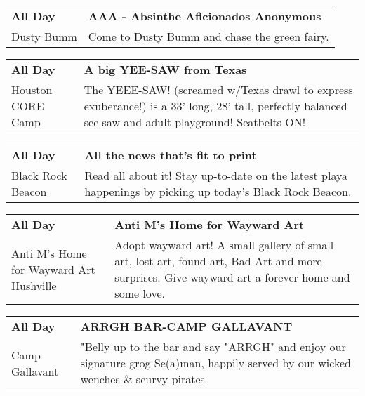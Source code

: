 \begin{tabular}{ p{1in} p{2.2in} }
    \textbf{All Day} & \textbf{AAA - Absinthe Aficionados Anonymous} \\
    Dusty Bumm \newline  & Come to Dusty Bumm and chase the green fairy. \\
    \hline 
\end{tabular}
    
\begin{tabular}{ p{1in} p{2.2in} }
    \textbf{All Day} & \textbf{A big YEE-SAW from Texas} \\
    Houston CORE Camp \newline  & The YEEE-SAW! (screamed w/Texas drawl to express exuberance!) is a 33' long, 28' tall, perfectly balanced see-saw and adult playground! Seatbelts ON! \\
    \hline 
\end{tabular}
    
\begin{tabular}{ p{1in} p{2.2in} }
    \textbf{All Day} & \textbf{All the news that's fit to print} \\
    Black Rock Beacon \newline  & Read all about it! Stay up-to-date on the latest playa happenings by picking up today's Black Rock Beacon. \\
    \hline 
\end{tabular}
    
\begin{tabular}{ p{1in} p{2.2in} }
    \textbf{All Day} & \textbf{Anti M's Home for Wayward Art} \\
    Anti M's Home for Wayward Art \newline Hushville & Adopt wayward art! A small gallery of small art, lost art, found art, Bad Art and more surprises.  Give wayward art a forever home and some love. \\
    \hline 
\end{tabular}
    
\begin{tabular}{ p{1in} p{2.2in} }
    \textbf{All Day} & \textbf{ARRGH BAR-CAMP GALLAVANT} \\
    Camp Gallavant \newline  & "Belly up to the bar and say "ARRGH" and enjoy our signature grog Se(a)man, happily served by our wicked wenches \& scurvy pirates \\
    \hline 
\end{tabular}
    
